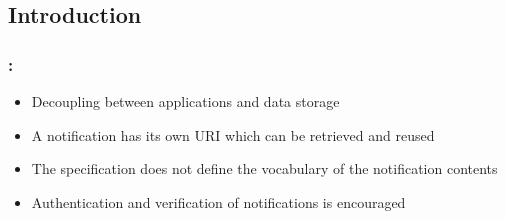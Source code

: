 \documentclass[aspectratio=169,hideallsubsections]{beamer}
\begin{document}
\subsection{Introduction}
\begin{frame}
  \frametitle{\insertsection: \insertsubsection}%
\label{intro}

  \begin{itemize}
    \item Decoupling between applications and data storage
    \item A notification has its own URI which can be retrieved and reused
    \item The specification does not define the vocabulary of the notification contents
    \item Authentication and verification of notifications is encouraged
  \end{itemize}
\end{frame}
\end{document}
